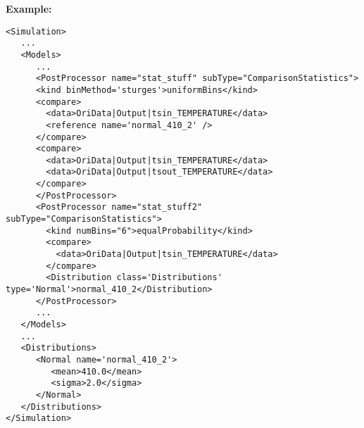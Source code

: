 \textbf{Example:}
\begin{lstlisting}[style=XML]
<Simulation>
   ...
   <Models>
      ...
      <PostProcessor name="stat_stuff" subType="ComparisonStatistics">
      <kind binMethod='sturges'>uniformBins</kind>
      <compare>
        <data>OriData|Output|tsin_TEMPERATURE</data>
        <reference name='normal_410_2' />
      </compare>
      <compare>
        <data>OriData|Output|tsin_TEMPERATURE</data>
        <data>OriData|Output|tsout_TEMPERATURE</data>
      </compare>
      </PostProcessor>
      <PostProcessor name="stat_stuff2" subType="ComparisonStatistics">
        <kind numBins="6">equalProbability</kind>
        <compare>
          <data>OriData|Output|tsin_TEMPERATURE</data>
        </compare>
        <Distribution class='Distributions' type='Normal'>normal_410_2</Distribution>
      </PostProcessor>
      ...
   </Models>
   ...
   <Distributions>
      <Normal name='normal_410_2'>
         <mean>410.0</mean>
         <sigma>2.0</sigma>
      </Normal>
   </Distributions>
</Simulation>
\end{lstlisting}

